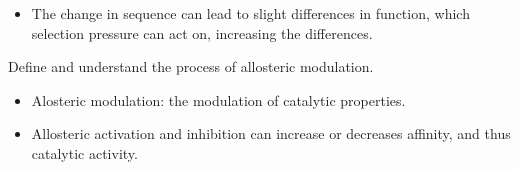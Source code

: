 \documentclass[12pt,a4paper]{article}
\begin{document}
\begin{itemize}
\begin{itemize}
            \item The change in sequence can lead to slight differences in function, which selection pressure can act on, increasing the differences.
        \end{itemize}
    {\color{G-Moon}\item Define and understand the process of allosteric modulation.}
        \begin{itemize}
            \item Alosteric modulation: the modulation of catalytic properties.
            \item Allosteric activation and inhibition can increase or decreases affinity, and thus catalytic activity.
        \end{itemize}
\end{itemize}

\clearpage
{}
\end{document}
